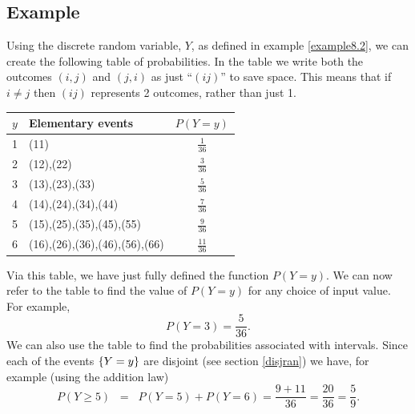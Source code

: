 \subsection{Example} \label{example8.3}
Using the discrete random variable, $Y$, as defined in example \ref{example8.2}, we can create the following table of probabilities. In the table we write both the outcomes $(i,j)$ and $(j,i)$ as just ``$(ij)$'' to save space. This means that if $i \neq j$ then $(ij)$ represents 2 outcomes, rather than just 1.
\begin{center}
\begin{tabular}{c|l|c}
$y$   & Elementary events 		 &$P(Y = y)$ 			\\ \hline
 1	 &(11)		         		 &$\frac{1}{36}$   		\\ 
  2	 &(12),(22)	 	 		 &$\frac{3}{36}$		\\ 
   3	 &(13),(23),(33)	 	 		 &$\frac{5}{36}$		\\ 
    4	 &(14),(24),(34),(44)	 		 &$\frac{7}{36}$		\\ 
     5	 &(15),(25),(35),(45),(55)		 &$\frac{9}{36}$		\\  
      6	 &(16),(26),(36),(46),(56),(66)	 &$\frac{11}{36}$		     
\end{tabular}
\end{center}
Via this table, we have just fully defined the function $P(Y = y)$. We can now refer to the table to find the value of $P(Y = y)$ for any choice of input value. For example,
\[
P(Y = 3) = \frac{5}{36}.
\]
We can also use the table to find the probabilities associated with intervals. Since each of the events $\left\{Y = y\right\}$ are disjoint (see section \ref{disjran}) we have, for example (using the addition law)
\[
P(Y \geq 5) \;\; = \;\; P(Y = 5) + P(Y = 6) = \frac{9 + 11}{36} = \frac{20}{36} = \frac{5}{9}. 
\]

